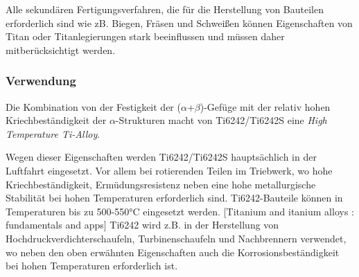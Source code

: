 
Alle sekundären Fertigungsverfahren, die für die Herstellung von Bauteilen erforderlich sind   wie zB. Biegen, Fräsen und Schweißen können Eigenschaften von Titan oder Titanlegierungen stark beeinflussen  und müssen daher mitberücksichtigt werden.




\subsubsection{Verwendung}


Die Kombination von der Festigkeit der ($\alpha$+$\beta$)-Gefüge mit der relativ hohen Kriechbeständigkeit der $\alpha$-Strukturen macht von Ti6242/Ti6242S eine \textit{High Temperature Ti-Alloy}.

Wegen dieser Eigenschaften werden Ti6242/Ti6242S hauptsächlich in der Luftfahrt eingesetzt. Vor allem bei rotierenden Teilen im Triebwerk, wo  hohe Kriechbeständigkeit, Ermüdungsresistenz  neben eine hohe metallurgische Stabilität bei hohen Temperaturen erforderlich sind. 
Ti6242-Bauteile können in Temperaturen bis zu 500-550°C eingesetzt werden. [Titanium and itanium alloys : fundamentals and apps]
Ti6242 wird z.B. in der Herstellung von Hochdruckverdichterschaufeln, Turbinenschaufeln und Nachbrennern verwendet, wo neben den oben erwähnten Eigenschaften auch die Korrosionsbeständigkeit bei hohen Temperaturen erforderlich ist. \newline




